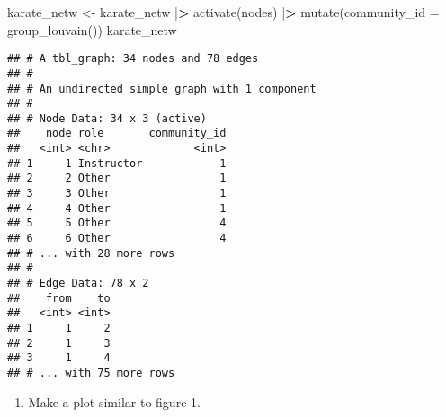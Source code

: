 \documentclass[
]{article}
\newenvironment{Shaded}{\begin{snugshade}}{\end{snugshade}}
\newcommand{\AttributeTok}[1]{\textcolor[rgb]{0.77,0.63,0.00}{#1}}
\newcommand{\ErrorTok}[1]{\textcolor[rgb]{0.64,0.00,0.00}{\textbf{#1}}}
\newcommand{\FunctionTok}[1]{\textcolor[rgb]{0.00,0.00,0.00}{#1}}
\newcommand{\NormalTok}[1]{#1}
\newcommand{\OtherTok}[1]{\textcolor[rgb]{0.56,0.35,0.01}{#1}}
\newcommand{\SpecialCharTok}[1]{\textcolor[rgb]{0.00,0.00,0.00}{#1}}
\providecommand{\tightlist}{%
  \setlength{\itemsep}{0pt}\setlength{\parskip}{0pt}}
\begin{document}
\begin{Shaded}
\begin{Highlighting}[]
\NormalTok{karate\_netw }\OtherTok{\textless{}{-}} 
\NormalTok{  karate\_netw }\SpecialCharTok{|}\ErrorTok{\textgreater{}}
  \FunctionTok{activate}\NormalTok{(nodes) }\SpecialCharTok{|}\ErrorTok{\textgreater{}}
  \FunctionTok{mutate}\NormalTok{(}\AttributeTok{community\_id =} \FunctionTok{group\_louvain}\NormalTok{())}
\NormalTok{karate\_netw}
\end{Highlighting}
\end{Shaded}

\begin{verbatim}
## # A tbl_graph: 34 nodes and 78 edges
## #
## # An undirected simple graph with 1 component
## #
## # Node Data: 34 x 3 (active)
##    node role       community_id
##   <int> <chr>             <int>
## 1     1 Instructor            1
## 2     2 Other                 1
## 3     3 Other                 1
## 4     4 Other                 1
## 5     5 Other                 4
## 6     6 Other                 4
## # ... with 28 more rows
## #
## # Edge Data: 78 x 2
##    from    to
##   <int> <int>
## 1     1     2
## 2     1     3
## 3     1     4
## # ... with 75 more rows
\end{verbatim}

\begin{enumerate}
\def\labelenumi{(\arabic{enumi})}
\setcounter{enumi}{10}
\tightlist
\item
  Make a plot similar to figure 1.
\end{enumerate}
\end{document}
